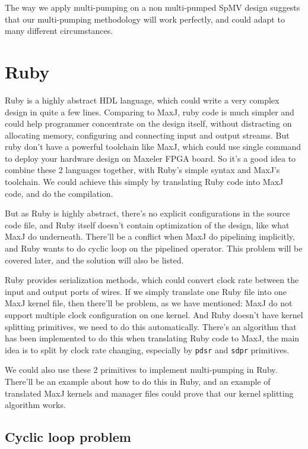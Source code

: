 \documentclass[a4paper, 10pt]{report}
\begin{document}
The way we apply multi-pumping on a non multi-pumped SpMV design suggests that our multi-pumping methodology will work perfectly, and could adapt to many different circumstances.

\chapter{Ruby}

Ruby is a highly abstract HDL language, which could write a very complex design in quite a few lines. Comparing to MaxJ, ruby code is much simpler and could help programmer concentrate on the design itself, without distracting on allocating memory, configuring and connecting input and output streams. But ruby don't have a powerful toolchain like MaxJ, which could use single command to deploy your hardware design on Maxeler FPGA board. So it's a good idea to combine these 2 languages together, with Ruby's simple syntax and MaxJ's toolchain. We could achieve this simply by translating Ruby code into MaxJ code, and do the compilation.

But as Ruby is highly abstract, there's no explicit configurations in the source code file, and Ruby itself doesn't contain optimization of the design, like what MaxJ do underneath. There'll be a conflict when MaxJ do pipelining implicitly, and Ruby wants to do cyclic loop on the pipelined operator. This problem will be covered later, and the solution will also be listed.

Ruby provides serialization methods, which could convert clock rate between the input and output ports of wires. If we simply translate one Ruby file into one MaxJ kernel file, then there'll be problem, as we have mentioned: MaxJ do not support multiple clock configuration on one kernel. And Ruby doesn't have kernel splitting primitives, we need to do this automatically. There's an algorithm that has been implemented to do this when translating Ruby code to MaxJ, the main idea is to split by clock rate changing, especially by \texttt{pdsr} and \texttt{sdpr} primitives. 

We could also use these 2 primitives to implement multi-pumping in Ruby. There'll be an example about how to do this in Ruby, and an example of translated MaxJ kernels and manager files could prove that our kernel splitting algorithm works.

\section{Cyclic loop problem}
\end{document}
